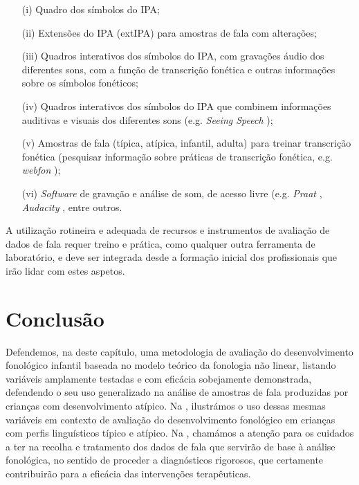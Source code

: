 \documentclass[output=paper,colorlinks,citecolor=brown,booklanguage=portuguese]{langscibook}
\begin{document}
\begin{itemize}[align=left]
\item[(i)] Quadro dos símbolos do IPA;
\item[(ii)] Extensões do IPA (extIPA) para amostras de fala com alterações;
\item[(iii)] Quadros interativos dos símbolos do IPA, com gravações áudio dos diferentes sons, com a função de transcrição fonética e outras informações sobre os símbolos fonéticos;
\item[(iv)] Quadros interativos dos símbolos do IPA que combinem informações auditivas e visuais dos diferentes sons (e.g. \emph{Seeing Speech} \citep{Lawson2018}); 
\item[(v)] Amostras de fala (típica, atípica, infantil, adulta) para treinar transcrição fonética (pesquisar informação sobre práticas de transcrição fonética, e.g. \emph{webfon} \citep{Bates2019});
\item[(vi)] \emph{Software} de gravação e análise de som, de acesso livre (e.g. \emph{Praat} \citep{Boersma2020}, \emph{Audacity} \citep{Team2020}, entre outros.
\end{itemize}
A utilização rotineira e adequada de recursos e instrumentos de avaliação de dados de fala requer treino e prática, como qualquer outra ferramenta de laboratório, e deve ser integrada desde a formação inicial dos profissionais que irão lidar com estes aspetos.

\section{Conclusão}
Defendemos, na  deste capítulo, uma metodologia de avaliação do desenvolvimento fonológico infantil baseada no modelo teórico da fonologia não linear, listando variáveis amplamente testadas e com eficácia sobejamente demonstrada, defendendo o seu uso generalizado na análise de amostras de fala produzidas por crianças com desenvolvimento atípico. Na , ilustrámos o uso dessas mesmas variáveis em contexto de avaliação do desenvolvimento fonológico em crianças com perfis linguísticos típico e atípico. Na , chamámos a atenção para os cuidados a ter na recolha e tratamento dos dados de fala que servirão de base à análise fonológica, no sentido de proceder a diagnósticos rigorosos, que certamente contribuirão para a eficácia das intervenções terapêuticas.
\end{document}
